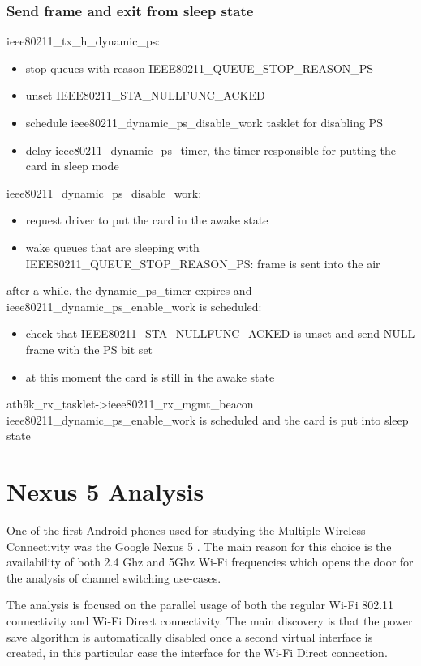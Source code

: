 \subsection{Send frame and exit from sleep state}
\label{sub-sec:analysis-3}
ieee80211_tx_h_dynamic_ps:
\begin{itemize}
\item stop queues with reason IEEE80211_QUEUE_STOP_REASON_PS
\item unset IEEE80211_STA_NULLFUNC_ACKED
\item schedule ieee80211_dynamic_ps_disable_work tasklet for disabling PS
\item delay ieee80211_dynamic_ps_timer, the timer responsible for putting the card in sleep mode
\end{itemize}
ieee80211_dynamic_ps_disable_work:
\begin{itemize}
\item request driver to put the card in the awake state
\item wake queues that are sleeping with IEEE80211_QUEUE_STOP_REASON_PS: frame is sent into the air
\end{itemize}
after a while, the dynamic_ps_timer expires and ieee80211_dynamic_ps_enable_work is scheduled:
\begin{itemize}
\item check that IEEE80211_STA_NULLFUNC_ACKED is unset and send NULL frame with the PS bit set
\item at this moment the card is still in the awake state
\end{itemize}
ath9k_rx_tasklet->ieee80211_rx_mgmt_beacon
ieee80211_dynamic_ps_enable_work is scheduled and the card is put into sleep state

\chapter{Nexus 5 Analysis}

One of the first Android phones used for studying the Multiple Wireless Connectivity was the Google Nexus 5 \cite{cite-nexus5}. The main reason for this choice is the availability of both 2.4 Ghz and 5Ghz Wi-Fi frequencies which opens the door for the analysis of channel switching use-cases. 

The analysis is focused on the parallel usage of both the regular Wi-Fi 802.11 connectivity and Wi-Fi Direct connectivity. The main discovery is that the power save algorithm is automatically disabled once a second virtual interface is created, in this particular case the interface for the Wi-Fi Direct connection. 

